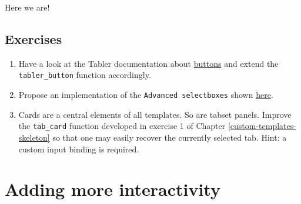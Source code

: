 \documentclass[
]{book}
\newenvironment{Shaded}{\begin{snugshade}}{\end{snugshade}}
\newcommand{\ControlFlowTok}[1]{\textcolor[rgb]{0.13,0.29,0.53}{\textbf{#1}}}
\newcommand{\DataTypeTok}[1]{\textcolor[rgb]{0.13,0.29,0.53}{#1}}
\newcommand{\DecValTok}[1]{\textcolor[rgb]{0.00,0.00,0.81}{#1}}
\newcommand{\KeywordTok}[1]{\textcolor[rgb]{0.13,0.29,0.53}{\textbf{#1}}}
\newcommand{\NormalTok}[1]{#1}
\newcommand{\OperatorTok}[1]{\textcolor[rgb]{0.81,0.36,0.00}{\textbf{#1}}}
\newcommand{\StringTok}[1]{\textcolor[rgb]{0.31,0.60,0.02}{#1}}
\providecommand{\tightlist}{%
  \setlength{\itemsep}{0pt}\setlength{\parskip}{0pt}}
\begin{document}
\begin{Shaded}
\end{Shaded}

Here we are!

\hypertarget{exercises-1}{%
\section{Exercises}\label{exercises-1}}

\begin{enumerate}
\def\labelenumi{\arabic{enumi}.}
\tightlist
\item
  Have a look at the Tabler documentation about \href{https://preview-dev.tabler.io/docs/buttons.html}{buttons} and extend the \texttt{tabler\_button} function accordingly.
\item
  Propose an implementation of the \texttt{Advanced\ selectboxes} shown \href{https://preview-dev.tabler.io/docs/form-elements.html\#}{here}.
\item
  Cards are a central elements of all templates. So are tabset panels. Improve the \texttt{tab\_card} function developed in exercise 1 of Chapter \ref{custom-templates-skeleton} so that one may easily recover the currently selected tab. Hint: a custom input binding is required.
\end{enumerate}

\hypertarget{custom-templates-interactivity}{%
\chapter{Adding more interactivity}\label{custom-templates-interactivity}}
\end{document}
